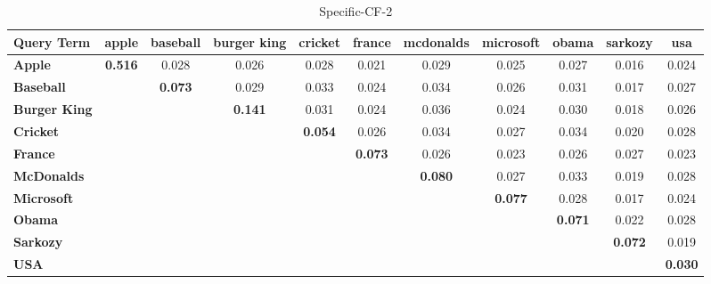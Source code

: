 \documentclass{sig-alternate}
\begin{document}

\begin{table}[!ht]
\centering
\resizebox{14cm}{!} 
{
	\begin{tabular}{|l|c|c|c|c|c|c|c|c|c|c|}
	\hline
\textbf{Query Term}  & \textbf{apple} & \textbf{baseball} & \textbf{burger king} & \textbf{cricket} & \textbf{france} & \textbf{mcdonalds} & \textbf{microsoft} & \textbf{obama} & \textbf{sarkozy} & \textbf{usa}\\
	\hline
\textbf{	Apple} & \textbf{0.516} & 0.028 & 0.026 & 0.028 & 0.021 & 0.029 & 0.025 & 0.027 & 0.016 & 0.024\\
	\hline
\textbf{	Baseball }& & \textbf{0.073} & 0.029 & 0.033 & 0.024 & 0.034 & 0.026 & 0.031 & 0.017 & 0.027\\
	\hline
\textbf{	Burger King }& & & \textbf{0.141} & 0.031 & 0.024 & 0.036 & 0.024 & 0.030 & 0.018 & 0.026\\
	\hline
\textbf{	Cricket} & & & & \textbf{0.054 }& 0.026 & 0.034 & 0.027 & 0.034 & 0.020 & 0.028\\
	\hline
\textbf{	France} & & & & & \textbf{0.073} & 0.026 & 0.023 & 0.026 & 0.027 & 0.023\\
	\hline
\textbf{	McDonalds} & & & & & & \textbf{0.080} & 0.027 & 0.033 & 0.019 & 0.028\\
	\hline
\textbf{	Microsoft} &  &  &  &  &  &  &\textbf{ 0.077} & 0.028 & 0.017 & 0.024
	\\
	\hline
\textbf{	Obama }&  &  &  &  &  &  &  & \textbf{0.071} & 0.022 & 0.028
	\\
	\hline
\textbf{	Sarkozy }&  &  &  &  &  &  &  &  & \textbf{0.072} & 0.019
	\\
	\hline
\textbf{	USA} &  &  &  &  &  &  &  &  &  & \textbf{0.030}\\
	\hline
	\end{tabular}
}
\caption{Specific-CF-2}\label{cf4}
\end{table}
\end{document}
